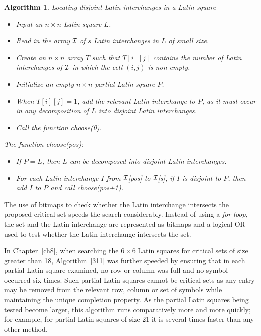 \documentclass[12pt]{report}
\newtheorem{algorithm}{Algorithm}
\begin{document}
\begin{algorithm}{Locating disjoint Latin interchanges in a Latin square}
\label{312}
\begin{itemize}
\item Input an $n \times n$ Latin square $L$.
\item Read in the array $\cal{I}$ of $s$ Latin interchanges in $L$ of small size.
\item Create an $n \times n$ array $T$ such that $T[i][j]$ contains the
number of Latin interchanges of $\cal{I}$ in which the cell $(i,j)$ is non-empty.
\item Initialize an empty $n \times n$ partial Latin square $P$.
\item When $T[i][j] = 1$, add the relevant Latin interchange to $P$, as it
must occur in any decomposition of $L$ into disjoint Latin interchanges.
\item Call the function choose(0).
\end{itemize}

The function choose(pos):

\begin{itemize}
\item If $P = L$, then $L$ can be decomposed into disjoint Latin interchanges.
\item For each Latin interchange $I$ from $\cal{I}$[pos] to $\cal{I}$[s],
if $I$ is disjoint to $P$, then add $I$ to $P$ and call choose(pos+1).
\end{itemize}
\end{algorithm}

The use of bitmaps to check whether the Latin interchange intersects the
proposed critical set speeds the search considerably.  Instead of
using a {\it for loop}, the set and the Latin interchange are represented
as bitmaps and a logical OR used to test whether the Latin interchange
intersects the set.

In Chapter~\ref{ch8}, when searching the $6 \times 6$ Latin squares for critical
sets of size greater than 18, Algorithm~\ref{311} was further speeded by
ensuring that in each partial Latin square examined, no row or column
was full and no symbol occurred six times.  Such partial Latin squares
cannot be critical sets as any entry may be removed from the relevant row,
column or set of symbols while maintaining the unique completion property.
As the partial Latin squares being tested become larger, this algorithm
runs comparatively more and more quickly; for example, for partial Latin
squares of size 21 it is several times faster than any other method.
\end{document}
